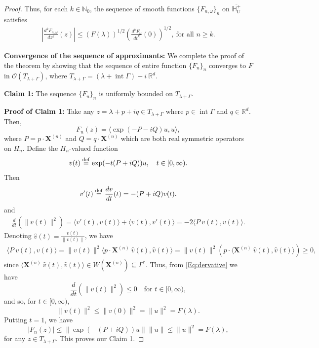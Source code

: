\documentclass[11pt,reqno]{amsart}
\theoremstyle{plain}
\theoremstyle{definition}
\numberwithin{equation}{section}
\newcommand{\bydef}{\stackrel{\rm def}{=}}
\begin{document}
\begin{proof}
Thus, for each $k \in \mathbb{N}_0$, the sequence of smooth functions $\{F_{n, \omega}\}_n$ on $\overline{\mathbb{H}^+_U}$ satisfies
\begin{align} \label{Eq:Arzela-cond}
    \left| \frac{d^k F_{n, \omega}}{dz^k}(z) \right|  \leq (F(\lambda))^{1/2} \left(\frac{d^k F_\omega}{d t^k}(0)\right)^{1/2}, \ \text{for all } n \geq k. 
\end{align}

\vspace{2mm}
    
\noindent \textbf{Convergence of the sequence of approximants:} We complete the proof of the theorem by showing that the sequence of entire function $\{F_n\}_n$ converges to $F$ in $\mathcal{O}(T_{\lambda + \Gamma})$, where $T_{\lambda + \Gamma} = (\lambda + \operatorname{int} \Gamma) + i \ \mathbb{R}^d$.

\vspace{2mm}

\noindent \textbf{Claim 1:} The sequence $\{F_n\}_n$ is uniformly bounded on $T_{\lambda + \Gamma}$.

\noindent \textbf{Proof of Claim 1:} Take any $z= \lambda + p + i q \in T_{\lambda + \Gamma}$ where $p \in \operatorname{int} \Gamma$ and $q\in \mathbb{R}^d$. Then,
$$
F_n(z) = \langle \exp(-P - i Q) u, u \rangle,
$$
where $P= p \cdot \boldsymbol{X}^{(n)}$ and $Q= q\cdot \boldsymbol{X}^{(n)}$ which are both real symmetric operators on $H_n$. Define the $H_n$-valued function
   $$
   v(t) \bydef \exp(-t(P+ iQ)) u, \quad t\in [0, \infty).
   $$
Then 
$$
v'(t) \bydef \frac{d v}{dt}(t) = -(P+i Q) v(t).
$$ and 
\begin{align} \label{Eq:dervative}
    \frac{d}{dt}(\|v(t)\|^2) = \langle v'(t),  v(t) \rangle + \langle v(t), v'(t) \rangle = -2\langle  P \ v(t),  v(t)\rangle.
\end{align}
Denoting $\hat{v}(t) = \frac{v(t)}{\|v(t)\|}$, we have 
\begin{align*}
    \langle  P \ v(t),  v(t)\rangle = \|v(t)\|^2 \langle  p \cdot \boldsymbol{X}^{(n)} \ \hat{v}(t),  \hat{v}(t)\rangle = \|v(t)\|^2  (p \cdot \langle \boldsymbol{X}^{(n)} \ \hat{v}(t),  \hat{v}(t)\rangle) \geq 0, 
\end{align*}
since $\langle \boldsymbol{X}^{(n)} \ \hat{v}(t),  \hat{v}(t)\rangle \in W(\boldsymbol{X}^{(n)}) \subseteq \Gamma^*$. Thus, from \eqref{Eq:dervative} we have
$$
 \frac{d}{dt}(\|v(t)\|^2) \leq 0 \quad \text{for } t\in [0, \infty), 
$$
and so, for $t\in [0, \infty)$,
$$
\|v(t)\|^2 \leq \|v(0)\|^2 = \|u\|^2 = F(\lambda).
$$
Putting $t=1$, we have 
$$
|F_n(z)| \leq \|\exp(-(P+iQ))u \| \|u\| \leq \|u\|^2 = F(\lambda),
$$
for any $z \in T_{\lambda + \Gamma}$. This proves our Claim 1.


\end{proof}
\end{document}
